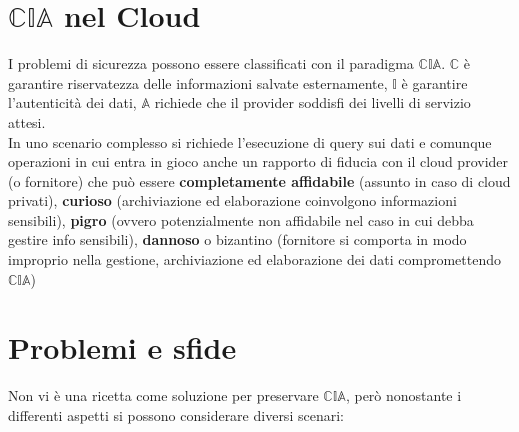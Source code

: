 \section{$\mathbb{CIA}$ nel Cloud}
I problemi di sicurezza possono essere classificati con il paradigma $\mathbb{CIA}$. $\mathbb{C}$ è garantire riservatezza delle informazioni salvate esternamente, $\mathbb{I}$ è garantire l'autenticità dei dati, $\mathbb{A}$ richiede che il provider soddisfi dei livelli di servizio attesi.\\
In uno scenario complesso si richiede l'esecuzione di query sui dati e comunque operazioni in cui entra in gioco anche un rapporto di fiducia con il cloud provider (o fornitore) che può essere \textbf{completamente affidabile} (assunto in caso di cloud privati), \textbf{curioso} (archiviazione ed elaborazione coinvolgono informazioni sensibili), \textbf{pigro} (ovvero potenzialmente non affidabile nel caso in cui debba gestire info sensibili), \textbf{dannoso} o bizantino (fornitore si comporta in modo improprio nella gestione, archiviazione ed elaborazione dei dati compromettendo $\mathbb{CIA}$)
\section{Problemi e sfide}
Non vi è una ricetta come soluzione per preservare $\mathbb{CIA}$, però nonostante i differenti aspetti si possono considerare diversi scenari:
